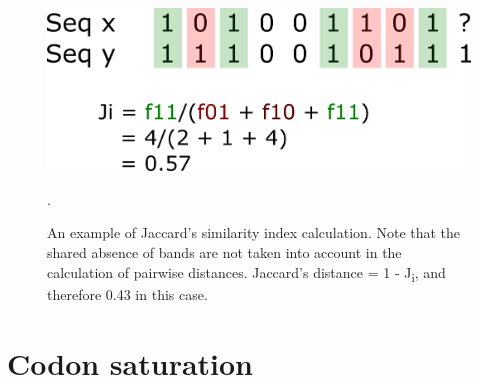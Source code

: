 \vspace{0.5cm}
\begin{figure}[H]
	\centering
	\includegraphics[scale = 1.3]{Images/jaccard}
    \newline
	\caption{An example of Jaccard's similarity index calculation. Note that the shared absence of bands are not taken into account in the calculation of pairwise distances. Jaccard's distance = 1 - J\textsubscript{i}, and therefore 0.43 in this case.}. 
	\label{fig:jaccard}
\end{figure}




\section{Codon saturation}

